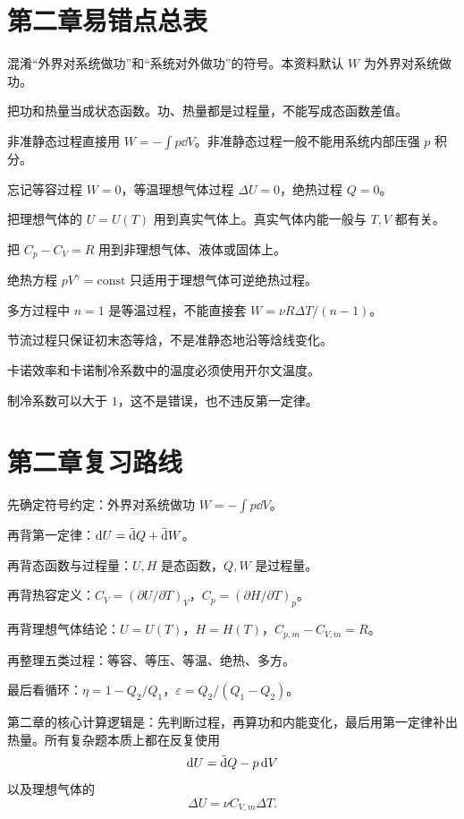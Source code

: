 \section{第二章易错点总表}

\begin{WarnBox}[本章高频错误]
\begin{PitfallList}
  \item 混淆“外界对系统做功”和“系统对外做功”的符号。本资料默认 \(W\) 为外界对系统做功。
  \item 把功和热量当成状态函数。功、热量都是过程量，不能写成态函数差值。
  \item 非准静态过程直接用 \(W=-\int p\dd V\)。非准静态过程一般不能用系统内部压强 \(p\) 积分。
  \item 忘记等容过程 \(W=0\)，等温理想气体过程 \(\Delta U=0\)，绝热过程 \(Q=0\)。
  \item 把理想气体的 \(U=U(T)\) 用到真实气体上。真实气体内能一般与 \(T,V\) 都有关。
  \item 把 \(C_p-C_V=R\) 用到非理想气体、液体或固体上。
  \item 绝热方程 \(pV^\gamma=\mathrm{const}\) 只适用于理想气体可逆绝热过程。
  \item 多方过程中 \(n=1\) 是等温过程，不能直接套 \(W=\nu R\Delta T/(n-1)\)。
  \item 节流过程只保证初末态等焓，不是准静态地沿等焓线变化。
  \item 卡诺效率和卡诺制冷系数中的温度必须使用开尔文温度。
  \item 制冷系数可以大于 \(1\)，这不是错误，也不违反第一定律。
\end{PitfallList}
\end{WarnBox}

\section{第二章复习路线}

\begin{MethodBox}[建议背诵顺序]
\begin{ReviewList}
  \item 先确定符号约定：外界对系统做功 \(W=-\int p\dd V\)。
  \item 再背第一定律：\(\mathop{}\!\mathrm{d} U=\mathop{}\!\bar{\mathrm{d}} Q+\mathop{}\!\bar{\mathrm{d}} W\)。
  \item 再背态函数与过程量：\(U,H\) 是态函数，\(Q,W\) 是过程量。
  \item 再背热容定义：\(C_V=(\partial U/\partial T)_V\)，\(C_p=(\partial H/\partial T)_p\)。
  \item 再背理想气体结论：\(U=U(T)\)，\(H=H(T)\)，\(C_{p,m}-C_{V,m}=R\)。
  \item 再整理五类过程：等容、等压、等温、绝热、多方。
  \item 最后看循环：\(\eta=1-Q_2/Q_1\)，\(\varepsilon=Q_2/(Q_1-Q_2)\)。
\end{ReviewList}
\end{MethodBox}

\begin{KeyBox}[第二章一句话总结]
第二章的核心计算逻辑是：先判断过程，再算功和内能变化，最后用第一定律补出热量。所有复杂题本质上都在反复使用
\[
  \mathop{}\!\mathrm{d} U=\mathop{}\!\bar{\mathrm{d}} Q-p\mathop{}\!\mathrm{d} V
\]
以及理想气体的
\[
  \Delta U=\nu C_{V,m}\Delta T.
\]
\end{KeyBox}